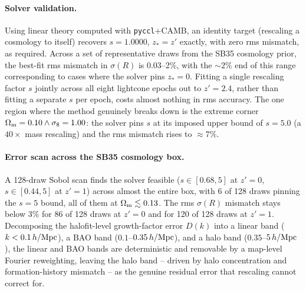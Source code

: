 \documentclass[11pt]{article}
\begin{document}
\paragraph{Solver validation.} Using linear theory computed with
\texttt{pyccl}+CAMB, an identity target (rescaling a cosmology to itself)
recovers $s=1.0000$, $z_*=z'$ exactly, with zero rms mismatch, as required. %
Across a set of representative draws from the SB35 cosmology prior, the
best-fit rms mismatch in $\sigma(R)$ is 0.03--2\%, with the $\sim2\%$ end of
this range corresponding to cases where the solver pins $z_*=0$. %
Fitting a single rescaling factor $s$ jointly across all eight lightcone
epochs out to $z'=2.4$, rather than fitting a separate $s$ per epoch, costs
almost nothing in rms accuracy. The one region where the method genuinely
breaks down is the extreme corner $\Omega_{\rm m}=0.10\wedge\sigma_8=1.00$:
the solver pins $s$ at its imposed upper bound of $s=5.0$ (a $40\times$ mass
rescaling) and the rms mismatch rises to $\approx7\%$. %

\paragraph{Error scan across the SB35 cosmology box.} A 128-draw Sobol scan
finds the solver feasible ($s\in[0.68,5]$ at $z'=0$, $s\in[0.44,5]$ at
$z'=1$) across almost the entire box, with 6 of 128 draws pinning the
$s=5$ bound, all of them at $\Omega_{\rm m}\lesssim0.13$. %
The rms $\sigma(R)$ mismatch stays below 3\% for 86 of 128 draws at $z'=0$
and for 120 of 128 draws at $z'=1$. %
Decomposing the halofit-level growth-factor error $D(k)$ into a linear band
($k<0.1\,h/{\rm Mpc}$), a BAO band ($0.1$--$0.35\,h/{\rm Mpc}$), and a
halo band ($0.35$--$5\,h/{\rm Mpc}$), the linear and BAO bands are
deterministic and removable by a map-level Fourier reweighting, leaving the
halo band -- driven by halo concentration and formation-history mismatch --
as the genuine residual error that rescaling cannot correct for.
\end{document}
